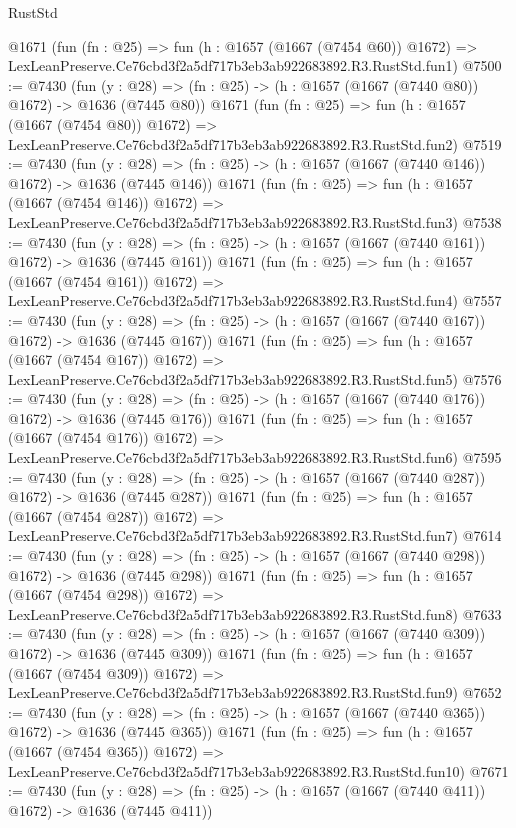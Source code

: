 \begin{lexlean}{RustStd}
\begin{coremodule}
    @1671
    (fun (fn : @25) =>
    fun (h : @1657 (@1667 (@7454 @60)) @1672) =>
    LexLeanPreserve.Ce76cbd3f2a5df717b3eb3ab922683892.R3.RustStd.fun1)
@7500 := @7430
    (fun (y : @28) => (fn : @25) -> (h : @1657 (@1667 (@7440 @80)) @1672) -> @1636 (@7445 @80))
    @1671
    (fun (fn : @25) =>
    fun (h : @1657 (@1667 (@7454 @80)) @1672) =>
    LexLeanPreserve.Ce76cbd3f2a5df717b3eb3ab922683892.R3.RustStd.fun2)
@7519 := @7430
    (fun (y : @28) => (fn : @25) -> (h : @1657 (@1667 (@7440 @146)) @1672) -> @1636 (@7445 @146))
    @1671
    (fun (fn : @25) =>
    fun (h : @1657 (@1667 (@7454 @146)) @1672) =>
    LexLeanPreserve.Ce76cbd3f2a5df717b3eb3ab922683892.R3.RustStd.fun3)
@7538 := @7430
    (fun (y : @28) => (fn : @25) -> (h : @1657 (@1667 (@7440 @161)) @1672) -> @1636 (@7445 @161))
    @1671
    (fun (fn : @25) =>
    fun (h : @1657 (@1667 (@7454 @161)) @1672) =>
    LexLeanPreserve.Ce76cbd3f2a5df717b3eb3ab922683892.R3.RustStd.fun4)
@7557 := @7430
    (fun (y : @28) => (fn : @25) -> (h : @1657 (@1667 (@7440 @167)) @1672) -> @1636 (@7445 @167))
    @1671
    (fun (fn : @25) =>
    fun (h : @1657 (@1667 (@7454 @167)) @1672) =>
    LexLeanPreserve.Ce76cbd3f2a5df717b3eb3ab922683892.R3.RustStd.fun5)
@7576 := @7430
    (fun (y : @28) => (fn : @25) -> (h : @1657 (@1667 (@7440 @176)) @1672) -> @1636 (@7445 @176))
    @1671
    (fun (fn : @25) =>
    fun (h : @1657 (@1667 (@7454 @176)) @1672) =>
    LexLeanPreserve.Ce76cbd3f2a5df717b3eb3ab922683892.R3.RustStd.fun6)
@7595 := @7430
    (fun (y : @28) => (fn : @25) -> (h : @1657 (@1667 (@7440 @287)) @1672) -> @1636 (@7445 @287))
    @1671
    (fun (fn : @25) =>
    fun (h : @1657 (@1667 (@7454 @287)) @1672) =>
    LexLeanPreserve.Ce76cbd3f2a5df717b3eb3ab922683892.R3.RustStd.fun7)
@7614 := @7430
    (fun (y : @28) => (fn : @25) -> (h : @1657 (@1667 (@7440 @298)) @1672) -> @1636 (@7445 @298))
    @1671
    (fun (fn : @25) =>
    fun (h : @1657 (@1667 (@7454 @298)) @1672) =>
    LexLeanPreserve.Ce76cbd3f2a5df717b3eb3ab922683892.R3.RustStd.fun8)
@7633 := @7430
    (fun (y : @28) => (fn : @25) -> (h : @1657 (@1667 (@7440 @309)) @1672) -> @1636 (@7445 @309))
    @1671
    (fun (fn : @25) =>
    fun (h : @1657 (@1667 (@7454 @309)) @1672) =>
    LexLeanPreserve.Ce76cbd3f2a5df717b3eb3ab922683892.R3.RustStd.fun9)
@7652 := @7430
    (fun (y : @28) => (fn : @25) -> (h : @1657 (@1667 (@7440 @365)) @1672) -> @1636 (@7445 @365))
    @1671
    (fun (fn : @25) =>
    fun (h : @1657 (@1667 (@7454 @365)) @1672) =>
    LexLeanPreserve.Ce76cbd3f2a5df717b3eb3ab922683892.R3.RustStd.fun10)
@7671 := @7430
    (fun (y : @28) => (fn : @25) -> (h : @1657 (@1667 (@7440 @411)) @1672) -> @1636 (@7445 @411))

\end{coremodule}
\end{lexlean}
